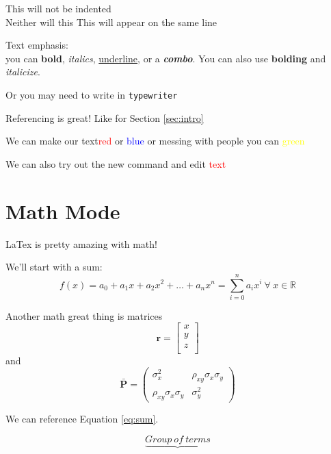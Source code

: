 \documentclass[12pt]{article}
\newcommand{\edit}{\textcolor{red}}	%
\begin{document}

This will not be indented\\
Neither will this
This will appear on the same line


Text emphasis: \\
you can \textbf{bold}, \textit{italics}, \underline{underline}, or a \textbf{\textit{combo}}.
You can also use {\bf bolding} and {\it italicize}.

Or you may need to write in \texttt{typewriter}

Referencing is great! Like for Section \ref{sec:intro}

We can make our text\textcolor{red}{red} or \textcolor{blue}{blue} or messing with people you can \textcolor{yellow}{green}

We can also try out the new command and edit \edit{text}


\newpage
\section{Math Mode} %

LaTex is pretty amazing with math!

We'll start with a sum:
\begin{equation}
f(x)=a_0 + a_1x+a_2x^2 + \dots + a_nx^n = \sum_{i=0}^n a_ix^i~\forall
~ x \in \mathbb{R}
\label{eq:sum}
\end{equation}

Another math great thing is matrices
\begin{equation}
\pmb{r}=\begin{bmatrix}
x \\
y \\
z \\
\end{bmatrix}
\end{equation}
and 
\begin{equation}
\pmb{\bar{P}}=\begin{pmatrix}
\sigma_x^2 & \rho_{xy}\sigma_x\sigma_y\\
\rho_{xy}\sigma_x\sigma_y & \sigma_y^2
\end{pmatrix}
\end{equation}

We can reference Equation \ref{eq:sum}.

\begin{equation}
\underbrace{Group~of~terms}
\end{equation}
\end{document}
